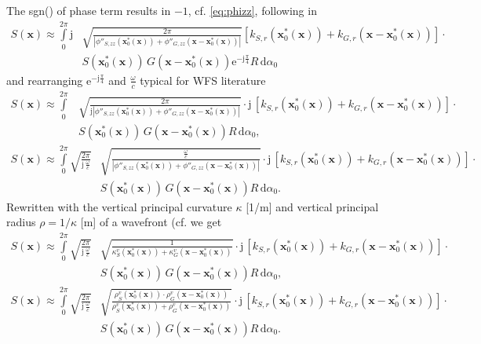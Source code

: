 \documentclass[a4paper,BCOR=15mm,10pt,twoside]{scrartcl}
\newcommand\e{\mathrm{e}}  %
\newcommand\im{\mathrm{j}}  %
\newcommand\fsd{\mathrm{d}}  %
\newcommand\wc{\frac{\omega}{c}}  %
\newcommand\jwc{\im\,\frac{\omega}{c}}  %
\newcommand\azx{\alpha}  %
\renewcommand{\vec}[1]{\mathbf{#1}}  %
\begin{document}
The sgn() of phase term results in $-1$, cf. \eqref{eq:phizz}, \cite[(4.11)ff]{Firtha2018Diss} following in
%
\begin{align}
\label{eq:HIE_FAR1_SPA2}
S(\vec{x}) \approx \int\limits_{0}^{2\pi}
\im
&\sqrt{\frac{2\pi}{|\phi''_{S,zz}(\vec{x}_0^*(\vec{x}))+\phi''_{G,zz}(\vec{x}-\vec{x}_0^*(\vec{x}))|}} 
\left[
k_{S,r}(\vec{x}_0^*(\vec{x})) + k_{G,r}(\vec{x} - \vec{x}_0^*(\vec{x}))
\right]\cdot\nonumber\\
&S(\vec{x}_0^*(\vec{x}))\,G(\vec{x}-\vec{x}_0^*(\vec{x}))
\e^{-\im \frac{\pi}{4}}
R \, \fsd \azx_0
\end{align}
%
and rearranging $\e^{-\im \frac{\pi}{4}}$ and $\wc$ typical for WFS literature
%
\begin{align}
\label{eq:HIE_FAR1_SPA3}
S(\vec{x}) \approx \int\limits_{0}^{2\pi} &
\sqrt{\frac{2\pi}{\im |\phi''_{S,zz}(\vec{x}_0^*(\vec{x}))+\phi''_{G,zz}(\vec{x}-\vec{x}_0^*(\vec{x}))|}} 
\cdot \im \, \left[
k_{S,r}(\vec{x}_0^*(\vec{x})) + k_{G,r}(\vec{x} - \vec{x}_0^*(\vec{x}))
\right]\cdot\nonumber\\
&S(\vec{x}_0^*(\vec{x}))\,G(\vec{x}-\vec{x}_0^*(\vec{x}))
R \, \fsd \azx_0,
\end{align}
%
\begin{align}
\label{eq:HIE_FAR1_SPA4}
S(\vec{x}) \approx \int\limits_{0}^{2\pi}
\sqrt{\frac{2\pi}{\jwc}} & 
\sqrt{\frac{\wc}{|\phi''_{S,zz}(\vec{x}_0^*(\vec{x}))+\phi''_{G,zz}(\vec{x}-\vec{x}_0^*(\vec{x}))|}} 
\cdot \im \, \left[
k_{S,r}(\vec{x}_0^*(\vec{x})) + k_{G,r}(\vec{x} - \vec{x}_0^*(\vec{x}))
\right]\cdot\nonumber\\
&S(\vec{x}_0^*(\vec{x}))\,G(\vec{x}-\vec{x}_0^*(\vec{x}))
R \, \fsd \azx_0.
\end{align}
%
Rewritten with the vertical principal curvature $\kappa$ [1/m] and vertical principal radius $\rho=1/\kappa$ [m] of a wavefront (cf. \cite[(4.15)-(4.17), Fig. 3.2, Tab. 3.1]{Firtha2018Diss} we get
%
\begin{align}
\label{eq:HIE_FAR1_SPA5}
S(\vec{x}) \approx \int\limits_{0}^{2\pi} 
\sqrt{\frac{2\pi}{\jwc}} &
\sqrt{\frac{1}{\kappa_S^v(\vec{x}_0^*(\vec{x}))+\kappa_G^v(\vec{x}-\vec{x}_0^*(\vec{x}))}} 
\cdot \im \, \left[
k_{S,r}(\vec{x}_0^*(\vec{x})) + k_{G,r}(\vec{x} - \vec{x}_0^*(\vec{x}))
\right]\cdot\nonumber\\
&S(\vec{x}_0^*(\vec{x}))\,G(\vec{x}-\vec{x}_0^*(\vec{x}))
R \, \fsd \azx_0,
\end{align}
%
\begin{align}
\label{eq:HIE_FAR1_SPA6}
S(\vec{x}) \approx \int\limits_{0}^{2\pi}
\sqrt{\frac{2\pi}{\jwc}} &
\sqrt{\frac{\rho_S^v(\vec{x}_0^*(\vec{x}))\cdot\rho_G^v(\vec{x}-\vec{x}_0^*(\vec{x}))}{\rho_S^v(\vec{x}_0^*(\vec{x}))+\rho_G^v(\vec{x}-\vec{x}_0^*(\vec{x}))}} 
\cdot \im \, \left[
k_{S,r}(\vec{x}_0^*(\vec{x})) + k_{G,r}(\vec{x} - \vec{x}_0^*(\vec{x}))
\right]\cdot\nonumber\\
&S(\vec{x}_0^*(\vec{x}))\,G(\vec{x}-\vec{x}_0^*(\vec{x}))
R \, \fsd \azx_0.
\end{align}
\end{document}
